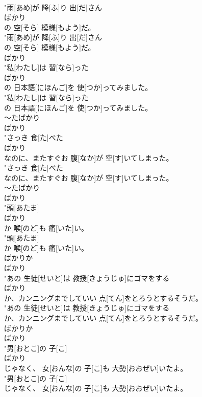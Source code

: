 \documentclass[8pt]{extreport}
\begin{document}
\begin{CJK}{UTF8}{min}
\\	"雨[あめ]が 降[ふ]り 出[だ]さん
\\	ばかり
\\	の 空[そら] 模様[もよう]だ。
\\	"雨[あめ]が 降[ふ]り 出[だ]さん
\\	の 空[そら] 模様[もよう]だ。
\\	ばかり
\\	"私[わたし]は 習[なら]った
\\	ばかり
\\	の 日本語[にほんご]を 使[つか]ってみました。
\\	"私[わたし]は 習[なら]った
\\	の 日本語[にほんご]を 使[つか]ってみました。
\\	～たばかり 
\\	ばかり
\\	"さっき 食[た]べた
\\	ばかり
\\	なのに、またすぐお 腹[なか]が 空[す]いてしまった。
\\	"さっき 食[た]べた
\\	なのに、またすぐお 腹[なか]が 空[す]いてしまった。
\\	～たばかり 
\\	ばかり
\\	"頭[あたま]
\\	ばかり
\\	か 喉[のど]も 痛[いた]い。
\\	"頭[あたま]
\\	か 喉[のど]も 痛[いた]い。
\\	ばかりか	
\\	ばかり
\\	"あの 生徒[せいと]は 教授[きょうじゅ]にゴマをする
\\	ばかり
\\	か、カンニングまでしていい 点[てん]をとろうとするそうだ。
\\	"あの 生徒[せいと]は 教授[きょうじゅ]にゴマをする
\\	か、カンニングまでしていい 点[てん]をとろうとするそうだ。
\\	ばかりか	
\\	ばかり
\\	"男[おとこ]の 子[こ]
\\	ばかり
\\	じゃなく、 女[おんな]の 子[こ]も 大勢[おおぜい]いたよ。
\\	"男[おとこ]の 子[こ]
\\	じゃなく、 女[おんな]の 子[こ]も 大勢[おおぜい]いたよ。

\end{CJK}
\end{document}

